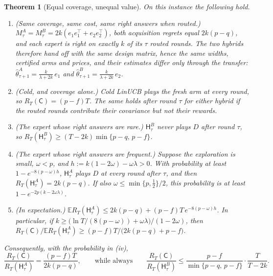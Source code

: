 \documentclass{article}
\newtheorem{theorem}{Theorem}
\theoremstyle{definition}
\theoremstyle{remark}
\newcommand{\E}{\mathbb{E}}
\theoremstyle{remark}
\newcommand{\Cold}{\mathsf{C}}
\newcommand{\Hyb}{\mathsf{H}}
\begin{document}
\begin{theorem}[Equal coverage, unequal value]
\label{thm:transfer-separation}
On this instance the following hold.
\begin{enumerate}[itemsep=1pt,topsep=1pt,leftmargin=*]
\item[(i)] \emph{(Same coverage, same cost, same right answers when routed.)}
$M_\tau^{A}=M_\tau^{B}=2k(e_1e_1^\top+e_2e_2^\top)$, both acquisition regrets
equal $2k(p-q)$, and each expert is right on exactly $k$ of its $\tau$ routed
rounds. The two hybrids therefore hand off with the same design matrix, hence
the same widths, certified arms and prices, and their estimates differ
only through the transfer:
$\widehat\theta^{A}_{\tau+1}=\frac{k}{\lambda+2k}\,e_1$ and
$\widehat\theta^{B}_{\tau+1}=\frac{k}{\lambda+2k}\,e_2$.
\item[(ii)] \emph{(Cold, and coverage alone.)} Cold LinUCB plays the fresh arm
at every round, so $R_T(\Cold)=(p-f)T$. The same holds after round $\tau$ for
either hybrid if the routed rounds contribute their covariance but not their
rewards.
\item[(iii)] \emph{(The expert whose right answers are rare.)}
$\Hyb^{B}_\tau$ never plays $D$ after round $\tau$, so
$R_T(\Hyb^{B}_\tau)\ge(T-2k)\min\{p-q,\,p-f\}$.
\item[(iv)] \emph{(The expert whose right answers are frequent.)} Suppose the
exploration is small, $\omega<p$, and $h:=k(1-2\omega)-\omega\lambda>0$. With
probability at least $1-e^{-8(p-\omega)h}$, $\Hyb^{A}_\tau$ plays $D$ at every
round after $\tau$, and then $R_T(\Hyb^{A}_\tau)=2k(p-q)$. If also
$\omega\le\min\{p,\tfrac12\}/2$, this probability is at least
$1-e^{-2p(k-2\omega\lambda)}$.
\item[(v)] \emph{(In expectation.)}
$\E R_T(\Hyb^{A}_\tau)\le2k(p-q)+(p-f)T\,e^{-8(p-\omega)h}$. In particular, if
$k\ge\bigl(\ln T/(8(p-\omega))+\omega\lambda\bigr)/(1-2\omega)$, then
$R_T(\Cold)/\E R_T(\Hyb^{A}_\tau)\ge(p-f)T/\bigl(2k(p-q)+p-f\bigr)$.
\end{enumerate}
Consequently, with the probability in (iv),
\[
\frac{R_T(\Cold)}{R_T(\Hyb^{A}_\tau)}=\frac{(p-f)T}{2k(p-q)},
\qquad\text{while always}\qquad
\frac{R_T(\Cold)}{R_T(\Hyb^{B}_\tau)}\le\frac{p-f}{\min\{p-q,\,p-f\}}\cdot\frac{T}{T-2k}.
\]
\end{theorem}
\end{document}
